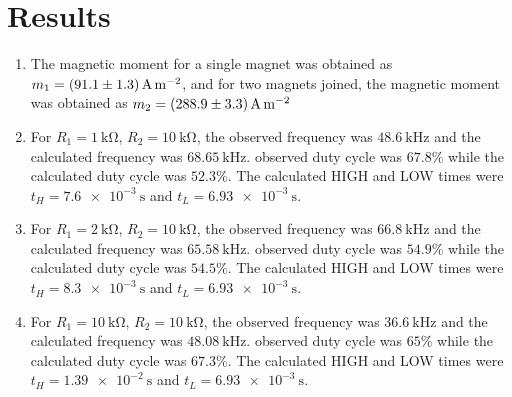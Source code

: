 \documentclass[%
 aip,
 amsmath,amssymb,
 reprint, floatfix%
]{revtex4-1}
\begin{document}
\section{Results}
    \begin{enumerate}
        \item The magnetic moment for a single magnet was obtained as $m_1 =  \SI[separate-uncertainty=true]{91.1\pm 1.3}{\ampere \per \metre \squared}$, and for two magnets joined, the magnetic moment was obtained as $m_2 = \SI[separate-uncertainty=true]{288.9\pm 3.3}{\ampere \per \metre \squared}$
        \item For $R_1 = \SI{1}{\kilo \ohm}$, $R_2 = \SI{10}{\kilo \ohm}$, the observed frequency was $\SI{48.6}{\kilo \hertz}$ and the calculated frequency was $\SI{68.65}{\kilo \hertz}$. observed duty cycle was $67.8\%$ while the calculated duty cycle was $52.3 \%$. The calculated HIGH and LOW times were $t_H = \SI{7.6e-3}{\second}$ and $t_L = \SI{6.93e-3}{\second}$.
        \item For $R_1 = \SI{2}{\kilo \ohm}$, $R_2 = \SI{10}{\kilo \ohm}$, the observed frequency was $\SI{66.8}{\kilo \hertz}$ and the calculated frequency was $\SI{65.58}{\kilo \hertz}$. observed duty cycle was $54.9\%$ while the calculated duty cycle was $54.5 \%$. The calculated HIGH and LOW times were $t_H = \SI{8.3e-3}{\second}$ and $t_L = \SI{6.93e-3}{\second}$.
        \item For $R_1 = \SI{10}{\kilo \ohm}$, $R_2 = \SI{10}{\kilo \ohm}$, the observed frequency was $\SI{36.6}{\kilo \hertz}$ and the calculated frequency was $\SI{48.08}{\kilo \hertz}$. observed duty cycle was $65\%$ while the calculated duty cycle was $67.3 \%$. The calculated HIGH and LOW times were $t_H = \SI{1.39e-2}{\second}$ and $t_L = \SI{6.93e-3}{\second}$.
    \end{enumerate}
\end{document}
